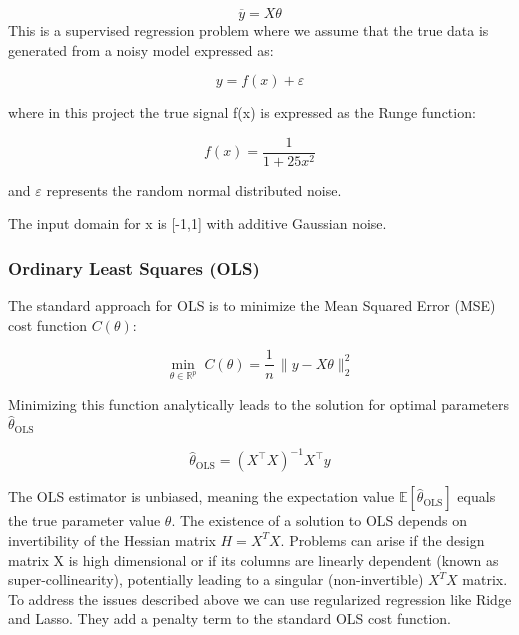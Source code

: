 \documentclass[amssymb,twocolumn,aps]{revtex4-2}
\begin{document}
\begin{equation}
    \overline{y} = X \theta
\end{equation}
This is a supervised regression problem where we assume that the true data is generated from a noisy model expressed as: 

\begin{equation}
y = f(x)+\varepsilon
\end{equation}

where in this project the true signal f(x) is expressed as the Runge function:

\begin{equation}
    f(x) = \frac{1}{1 + 25x^2}
    \label{eq:runge}
\end{equation}

and $\varepsilon$ represents the random normal distributed noise. 

The input domain for x is [-1,1] with additive Gaussian noise. 
\subsubsection{Ordinary Least Squares (OLS)}

The standard approach for OLS is to minimize the Mean Squared Error (MSE) cost function $C (\theta)$: 

\begin{equation}
    \min_{\theta\in\mathbb{R}^p} \; C(\theta)
= \frac{1}{n}\,\lVert y - X\theta \rVert_2^2
\end{equation}

Minimizing this function analytically leads to the solution for optimal parameters $\hat{\theta}_{\text{OLS}}$

\begin{equation}
\hat{\theta}_{\text{OLS}} = (X^\top X)^{-1} X^\top y
\end{equation}

The OLS estimator is unbiased, meaning the expectation value $\mathbb{E}\!\left[\hat{\theta}_{\text{OLS}}\right]$ equals the true parameter value $\theta$. The existence of a solution to OLS depends on invertibility of the Hessian matrix $H=X^TX$. Problems can arise if the design matrix X is high dimensional or if its columns are linearly dependent (known as super-collinearity), potentially leading to a singular (non-invertible) $X^TX$ matrix. \\

To address the issues described above we can use regularized regression like Ridge and Lasso. They add a penalty term to the standard OLS cost function. \\
\end{document}
